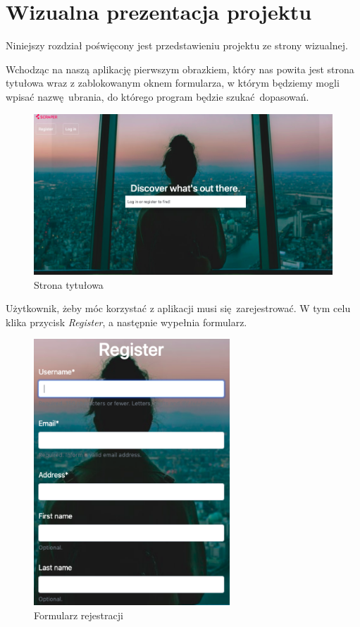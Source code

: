 \chapter {Wizualna prezentacja projektu} 

Niniejszy rozdział poświęcony jest przedstawieniu projektu ze strony wizualnej.

Wchodząc na naszą aplikację pierwszym obrazkiem, który nas powita jest strona tytułowa wraz z zablokowanym oknem formularza, w którym będziemy mogli wpisać nazwę ubrania, do którego program będzie szukać dopasowań.

\begin{figure}[h]
    \includegraphics[width=1.10\textwidth]{zdjecia/tytulowa}
    \caption{Strona tytułowa}
\end{figure}

Użytkownik, żeby móc korzystać z aplikacji musi się zarejestrować. W tym celu klika przycisk \emph{Register}, a następnie wypełnia formularz.

\begin{figure}[h]
    \includegraphics[height=10cm]{zdjecia/registration}
    \caption{Formularz rejestracji}
\end{figure}

